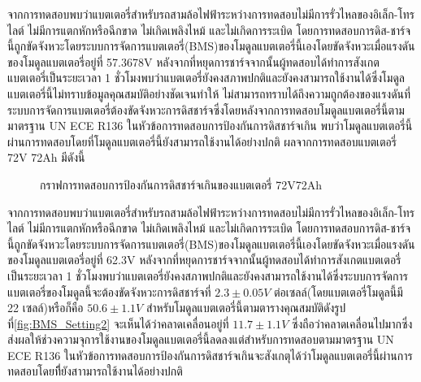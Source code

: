 จากการทดสอบพบว่าแบตเตอรี่สำหรับรถสามล้อไฟฟ้าระหว่างการทดสอบไม่มีการรั่วไหลของอิเล็ก-โทรไลต์ ไม่มีการแตกหักหรือฉีกขาด ไม่เกิดเพลิงไหม้ และไม่เกิดการระเบิด
โดยการทดสอบการดิส-ชาร์จนี้ถูกขัดจังหวะโดยระบบการจัดการแบตเตอรี่(BMS)ของโมดูลแบตเตอรี่นี้เองโดยขัดจังหวะเมื่อแรงดันของโมดูลแบตเตอรี่อยู่ที่ 57.3678V 
หลังจากที่หยุดการชาร์จจากนั้นผู้ทดสอบได้ทำการสังเกตแบตเตอรี่เป็นระยะเวลา 1 ชั่วโมงพบว่าแบตเตอรี่ยังคงสภาพปกติและยังคงสามารถใช้งานได้ซึ่งโมดูลแบตเตอรี่นี้ไม่ทราบข้อมูลคุณสมบัติอย่างชัดเจนทำให้
ไม่สามารถทราบได้ถึงความถูกต้องของแรงดันที่ระบบการจัดการแบตเตอรี่ต้องขัดจังหวะการดิสชาร์จซึ่งโดยหลังจากการทดสอบโมดูลแบตเตอรี่นี้ตามมาตรฐาน UN ECE R136 ในหัวข้อการทดสอบการป้องกันการดิสชาร์จเกิน
พบว่าโมดูลแบตเตอรี่นี้ผ่านการทดสอบโดยที่โมดูลแบตเตอรี่นี้ยังสามารถใช้งานได้อย่างปกติ
\newpage
ผลจากการทดสอบแบตเตอรี่ 72V 72Ah มีดังนี้
\begin{center}
	\begin{figure}[H]
		\centering
		\captionsetup{justification=centering,margin=2cm}
		\caption{กราฟการทดสอบการป้องกันการดิสชาร์จเกินของแบตเตอรี่ 72V72Ah}
	\end{figure}
\end{center}
จากการทดสอบพบว่าแบตเตอรี่สำหรับรถสามล้อไฟฟ้าระหว่างการทดสอบไม่มีการรั่วไหลของอิเล็ก-โทรไลต์ ไม่มีการแตกหักหรือฉีกขาด ไม่เกิดเพลิงไหม้ และไม่เกิดการระเบิด
โดยการทดสอบการดิส-ชาร์จนี้ถูกขัดจังหวะโดยระบบการจัดการแบตเตอรี่(BMS)ของโมดูลแบตเตอรี่นี้เองโดยขัดจังหวะเมื่อแรงดันของโมดูลแบตเตอรี่อยู่ที่ 62.3V 
หลังจากที่หยุดการชาร์จจากนั้นผู้ทดสอบได้ทำการสังเกตแบตเตอรี่เป็นระยะเวลา 1 ชั่วโมงพบว่าแบตเตอรี่ยังคงสภาพปกติและยังคงสามารถใช้งานได้ซึ่งระบบการจัดการแบตเตอรี่ของโมดูลนี้จะต้องขัดจังหวะการดิสชาร์จที่
$2.3\pm 0.05V$ ต่อเซลล์(โดยแบตเตอรี่โมดูลนี้มี 22 เซลล์)หรือก็คือ $50.6\pm 1.1V$ สำหรับโมดูลแบตเตอรี่นี้ตามตารางคุณสมบัติดังรูปที่\ref{fig:BMS_Setting2}
จะเห็นได้ว่าคลาดเคลื่อนอยู่ที่ $11.7\pm 1.1V$ ซึ่งถือว่าคลาดเคลื่อนไปมากซึ่งส่งผลให้ช่วงความจุการใช้งานของโมดูลแบตเตอรี่นี้ลดลงแต่สำหรับการทดสอบตามมาตรฐาน UN ECE R136 ในหัวข้อการทดสอบการป้องกันการดิสชาร์จเกินจะสังเกตุได้ว่าโมดูลแบตเตอรี่นี้ผ่านการทดสอบโดยทีี่ยังสาามารถใช้งานได้อย่างปกติ
